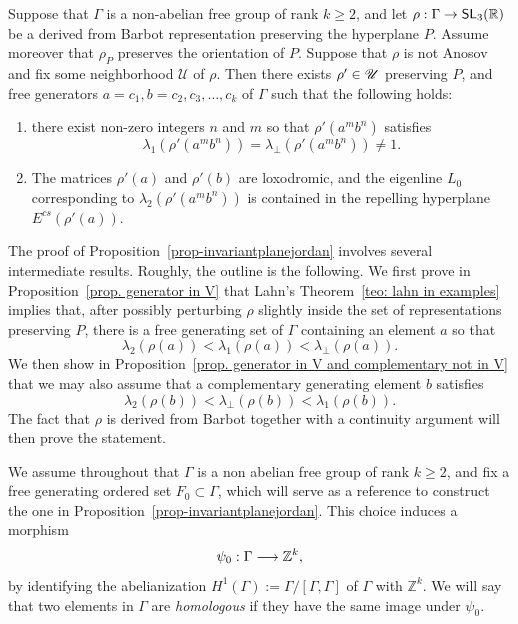 \documentclass[AHL,Unicode,longabstracts]{cedram}
\DeclareMathOperator{\SL}{\mathsf{SL}}
\newcommand{\R}{\mathbb{R}}
\newcommand{\RR}{\R}
\newcommand{\ZZ}{\mathbb{Z}}
\newcommand{\scU}{\mathscr{U}}
\newcommand{\Ecs}{E^{cs}}
\renewcommand*{\to}{\mathchoice{\longrightarrow}{\rightarrow}{\rightarrow}{\rightarrow}}
\let\oldin\in
\renewcommand{\in}{\mathchoice{\oldin}{\oldin}{\,\oldin\,}{\,\oldin\,}}
\newcommand{\RR}{\mathbb{R}}
\begin{document}
\begin{prop}\label{prop-invariantplanejordan}
Suppose that $\Gamma$ is a non-abelian free group of rank $k\geq 2$, and let $\rho: \Gamma \to \SL_3(\RR)$ be a derived from Barbot representation preserving the hyperplane $P$. Assume moreover that $\rho_P$ preserves the orientation of $P$. Suppose that $\rho$ is not Anosov and fix some neighborhood $\scU$ of $\rho$. Then there exists $\rho'\in\scU$ preserving $P$, and free generators $a=c_1,b=c_2,c_3,\dots, c_k$ of $\Gamma$ such that the following holds:
\begin{enumerate}
\item\label{prop5.5.1} there exist non-zero integers $n$ and $m$ so that $\rho'(a^mb^n)$ satisfies
\[
\lambda_1(\rho'(a^mb^n))=\lambda_\perp(\rho'(a^mb^n))\neq 1.
\]
\item\label{prop5.5.2} The matrices $\rho'(a)$ and $\rho'(b)$ are loxodromic, and the eigenline $L_0$ corresponding to $\lambda_2(\rho'(a^mb^n))$ is contained in the repelling hyperplane $\Ecs(\rho'(a))$.
\end{enumerate}
\end{prop}

The proof of Proposition~\ref{prop-invariantplanejordan} involves several intermediate results. Roughly, the outline is the following.
We first prove in Proposition~\ref{prop. generator in V} that Lahn's Theorem~\ref{teo: lahn in examples} implies that, after possibly perturbing $\rho$ slightly inside the set of representations preserving $P$, there is a free generating set of $\Gamma$ containing an element $a$ so that
\[
\lambda_2(\rho(a))<\lambda_1(\rho(a))<\lambda_\perp(\rho(a)).
\]
We then show in Proposition~\ref{prop. generator in V and complementary not in V} that we may also assume that a complementary generating element $b$ satisfies
\[
\lambda_2(\rho(b))<\lambda_\perp(\rho(b))<\lambda_1(\rho(b)).
\]
The fact that $\rho$ is derived from Barbot together with a continuity argument will then prove the statement.


We assume throughout that $\Gamma$ is a non abelian free group of rank $k\geq 2$, and fix a free generating ordered set $F_0\subset\Gamma$, which will serve as a reference to construct the one in Proposition~\ref{prop-invariantplanejordan}.
This choice induces a morphism
\[
\psi_0:\Gamma\to \ZZ^k,
\]
by identifying the abelianization $H^1(\Gamma):=\Gamma/[\Gamma,\Gamma]$ of $\Gamma$ with $\ZZ^k$.
We will say that two elements in $\Gamma$ are \emph{homologous} if they have the same image under $\psi_0$.
\end{document}
